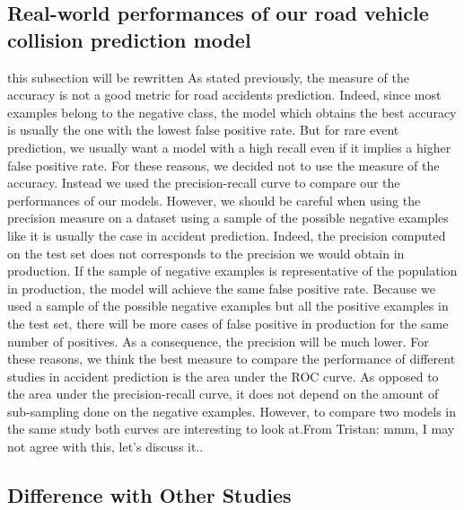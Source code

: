 \documentclass[conference]{IEEEtran}
\newcommand{\todo}[1]{\colorlet{saved}{.}\color{blue}#1\color{saved}}
\newcommand{\TG}[1]{\colorlet{saved}{.}\color{orange}From Tristan: #1\color{saved}}
\begin{document}
\subsection{Real-world performances of our road vehicle collision prediction model}
\todo{this subsection will be rewritten}
As stated previously, the measure of the accuracy is not a good metric for road accidents prediction. Indeed, since most examples belong to the negative class, the model which obtains the best accuracy is usually the one with the lowest false positive rate. But for rare event prediction, we usually want a model with a high recall even if it implies a higher false positive rate. For these reasons, we decided not to use the measure of the accuracy. Instead we used the precision-recall curve to compare our the performances of our models. However, we should be careful when using the precision measure on a dataset using a sample of the possible negative examples like it is usually the case in accident prediction. Indeed, the precision computed on the test set does not corresponds to the precision we would obtain in production.
If the sample of negative examples is representative of the population
in production, the model will achieve the same false positive rate.
Because we used a sample of the possible negative examples but all the 
positive examples in the test set, there will be more cases of false positive in production for the same number of positives. As a consequence, the precision will be much lower.
For these reasons, we think the best measure to compare the performance of
different studies in accident prediction is the area under the ROC curve.
As opposed to the area under the precision-recall curve, it does not depend on the amount of sub-sampling done on the negative examples. However, to compare two models in the same study both curves are interesting to look at.\TG{mmm, I may not agree with this, let's discuss it.}. 


\subsection{Difference with Other Studies}
\end{document}
